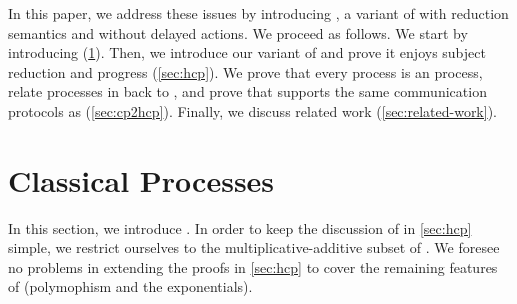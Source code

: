 \documentclass[copyright,creativecommons]{eptcs}
\begin{document}
In this paper, we address these issues by introducing \hcp, a variant of \dhcp with reduction semantics and without delayed actions. We proceed as follows. We start by introducing \cp (\cref{sec:cp}). Then, we introduce our variant of \hcp and prove it enjoys subject reduction and progress (\cref{sec:hcp}). We prove that every \cp process is an \hcp process, relate processes in \hcp back to \cp, and prove that \hcp supports the same communication protocols as \cp (\cref{sec:cp2hcp}). Finally, we discuss related work (\cref{sec:related-work}).

\section{Classical Processes}
\label{sec:cp}

In this section, we introduce \cp. In order to keep the discussion of \hcp in \cref{sec:hcp} simple, we restrict ourselves to the multiplicative-additive subset of \cp. We foresee no problems in extending the proofs in \cref{sec:hcp} to cover the remaining features of \cp (polymophism and the exponentials).
\end{document}
